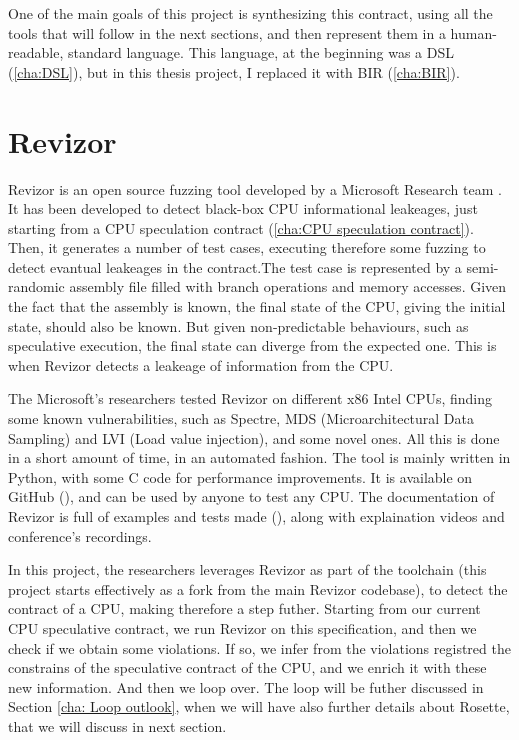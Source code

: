 One of the main goals of this project is synthesizing this contract, using all
the tools that will follow in the next sections, and then represent them in a human-readable,
standard language. This language, at the beginning was a DSL (\ref{cha:DSL}), but
in this thesis project, I replaced it with BIR (\ref{cha:BIR}).

\section{Revizor}
\label{cha:Revizor} Revizor is an open source fuzzing tool developed by a
Microsoft Research team \cite{article}. It has been developed to detect black-box
CPU informational leakeages, just starting from a CPU speculation contract (\ref{cha:CPU
speculation contract}). Then, it generates a number of test cases, executing therefore
some fuzzing to detect evantual leakeages in the contract.The test case is represented
by a semi-randomic assembly file filled with branch operations and memory accesses.
Given the fact that the assembly is known, the final state of the CPU, giving
the initial state, should also be known. But given non-predictable behaviours, such
as speculative execution, the final state can diverge from the expected one. This
is when Revizor detects a leakeage of information from the CPU.

The Microsoft's researchers tested Revizor on different x86 Intel CPUs, finding
some known vulnerabilities, such as Spectre, MDS (Microarchitectural Data Sampling)
and LVI (Load value injection), and some novel ones. All this is done in a short
amount of time, in an automated fashion. The tool is mainly written in Python, with
some C code for performance improvements. It is available on GitHub (\cite{repo}),
and can be used by anyone to test any CPU. The documentation of Revizor is full
of examples and tests made (\cite{misc}), along with explaination videos and conference's
recordings.

In this project, the researchers leverages Revizor as part of the toolchain (this
project starts effectively as a fork from the main Revizor codebase), to detect the
contract of a CPU, making therefore a step futher. Starting from our current CPU
speculative contract, we run Revizor on this specification, and then we check if
we obtain some violations. If so, we infer from the violations registred the constrains
of the speculative contract of the CPU, and we enrich it with these new
information. And then we loop over. The loop will be futher discussed in Section
\ref{cha: Loop outlook}, when we will have also further details about Rosette,
that we will discuss in next section.

